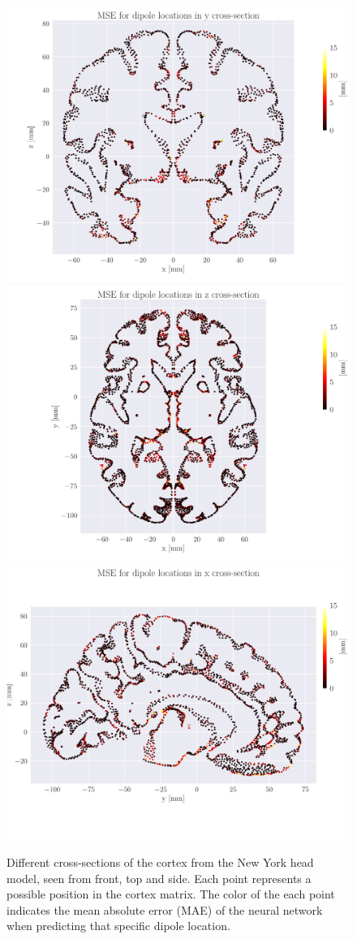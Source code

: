 \documentclass[a4paper, UKenglish, 11pt]{uiomaster}
\begin{document}
\begin{figure}[!htb]
    \centering
    \includegraphics[width=0.7\linewidth]{figures/NEW_simple_dipole_error_Euclidean Distance_00.pdf}
    \vspace{10pt} %
    \includegraphics[width=0.7\linewidth]{figures/NEW_simple_dipole_error_Euclidean Distance_10.pdf}
    \vspace{10pt} %
    \includegraphics[width=0.7\linewidth]{figures/NEW_simple_dipole_error_Euclidean Distance_20.pdf}
    \caption{Different cross-sections of the cortex from the New York head model, seen from front, top and side. Each point represents a possible position in the cortex matrix. The color of the each point indicates the mean absolute error (MAE) of the neural network when predicting that specific dipole location.}
    \label{fig:MAE_crossections}
\end{figure}
\end{document}
